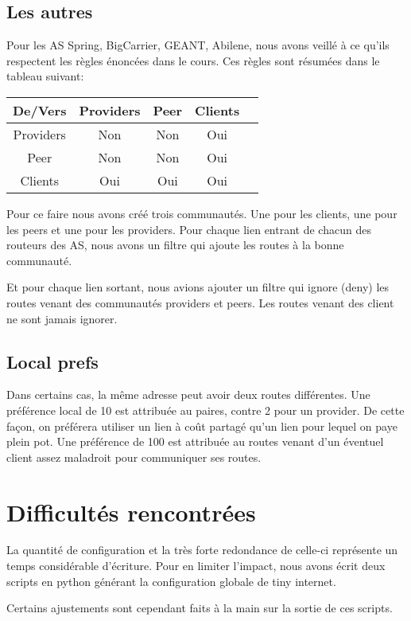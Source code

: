 \documentclass{article}
\begin{document}
\subsection{Les autres}
Pour les AS Spring, BigCarrier, GEANT, Abilene, nous avons veillé à ce qu'ils respectent les règles énoncées dans le cours. Ces règles sont résumées dans le tableau suivant:


\begin{center}
\begin{tabular}{|c|c|c|c|c|}
\hline
De/Vers & Providers & Peer & Clients \\
\hline
 Providers & Non & Non & Oui \\
\hline
 Peer & Non & Non & Oui \\
\hline
  Clients & Oui & Oui & Oui \\
\hline

\end{tabular}
\end{center}


Pour ce faire nous avons créé trois communautés. Une pour les clients, une pour les peers et une pour les providers. Pour chaque lien entrant de chacun des routeurs des AS, nous avons un filtre qui ajoute les routes à la bonne communauté.

Et pour chaque lien sortant, nous avions ajouter un filtre qui ignore (deny) les routes venant des communautés providers et peers.
Les routes venant des client ne sont jamais ignorer.

\subsection{Local prefs}

Dans certains cas, la même adresse peut avoir deux routes différentes. Une préférence local de 10 est attribuée au paires, contre 2 pour un provider. De cette façon, on préférera utiliser un lien à coût partagé qu'un lien pour lequel on paye plein pot.
Une préférence de 100 est attribuée au routes venant d'un éventuel client assez maladroit pour communiquer ses routes.


\section*{Difficultés rencontrées}
La quantité de configuration et la très forte redondance de celle-ci représente un temps considérable d'écriture. Pour en limiter l'impact, nous avons écrit deux scripts en python générant la configuration globale de tiny internet.

Certains ajustements sont cependant faits à la main sur la sortie de ces scripts.
\end{document}
